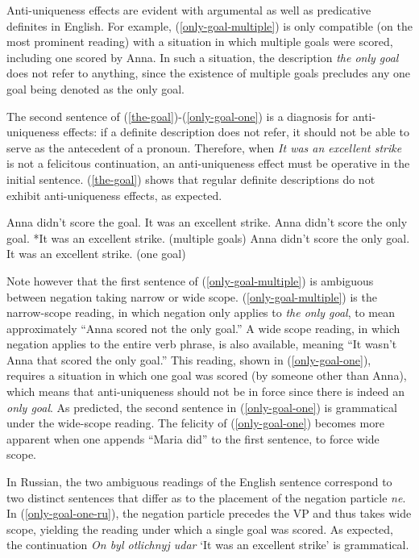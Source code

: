 \documentclass{article}
\begin{document}
Anti-uniqueness effects are evident with argumental as well as predicative definites in English. For example, (\ref{only-goal-multiple}) is only compatible (on the most prominent reading) with a situation in which multiple goals were scored, including one scored by Anna. In such a situation, the description \textit{the only goal} does not refer to anything, since the existence of multiple goals precludes any one goal being denoted as the only goal.

The second sentence of (\ref{the-goal})-(\ref{only-goal-one}) is a diagnosis for anti-uniqueness effects: if a definite description does not refer, it should not be able to serve as the antecedent of a pronoun. Therefore, when \textit{It was an excellent strike} is not a felicitous continuation, an anti-uniqueness effect must be operative in the initial sentence. (\ref{the-goal}) shows that regular definite descriptions do not exhibit anti-uniqueness effects, as expected.

\begin{exe}
	\ex \label{the-goal} Anna didn't score the goal. It was an excellent strike.
	\ex \label{only-goal-multiple} Anna didn't score the only goal. *It was an excellent strike. (multiple goals)
	\ex \label{only-goal-one} Anna didn't score the only goal. It was an excellent strike. (one goal)
\end{exe}

Note however that the first sentence of (\ref{only-goal-multiple}) is ambiguous between negation taking narrow or wide scope. (\ref{only-goal-multiple}) is the narrow-scope reading, in which negation only applies to \textit{the only goal}, to mean approximately ``Anna scored not the only goal.'' A wide scope reading, in which negation applies to the entire verb phrase, is also available, meaning ``It wasn't Anna that scored the only goal.'' This reading, shown in (\ref{only-goal-one}), requires a situation in which one goal was scored (by someone other than Anna), which means that anti-uniqueness should not be in force since there is indeed an \textit{only goal}. As predicted, the second sentence in (\ref{only-goal-one}) is grammatical under the wide-scope reading. The felicity of (\ref{only-goal-one}) becomes more apparent when one appends ``Maria did'' to the first sentence, to force wide scope.

In Russian, the two ambiguous readings of the English sentence correspond to two distinct sentences that differ as to the placement of the negation particle \textit{ne}. In (\ref{only-goal-one-ru}), the negation particle precedes the VP and thus takes wide scope, yielding the reading under which a single goal was scored. As expected, the continuation \textit{On byl otlichnyj udar} `It was an excellent strike' is grammatical.
\end{document}

